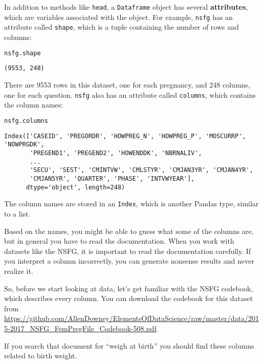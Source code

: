 In addition to methods like \passthrough{\lstinline!head!}, a
\passthrough{\lstinline!Dataframe!} object has several
\textbf{attributes}, which are variables associated with the object. For
example, \passthrough{\lstinline!nsfg!} has an attribute called
\passthrough{\lstinline!shape!}, which is a tuple containing the number
of rows and columns:

\begin{lstlisting}[language=Python,style=source]
nsfg.shape
\end{lstlisting}

\begin{lstlisting}[style=output]
(9553, 248)
\end{lstlisting}

There are 9553 rows in this dataset, one for each pregnancy, and 248
columns, one for each question. \passthrough{\lstinline!nsfg!} also has
an attribute called \passthrough{\lstinline!columns!}, which contains
the column names:

\begin{lstlisting}[language=Python,style=source]
nsfg.columns
\end{lstlisting}

\begin{lstlisting}[style=output]
Index(['CASEID', 'PREGORDR', 'HOWPREG_N', 'HOWPREG_P', 'MOSCURRP', 'NOWPRGDK',
       'PREGEND1', 'PREGEND2', 'HOWENDDK', 'NBRNALIV',
       ...
       'SECU', 'SEST', 'CMINTVW', 'CMLSTYR', 'CMJAN3YR', 'CMJAN4YR',
       'CMJAN5YR', 'QUARTER', 'PHASE', 'INTVWYEAR'],
      dtype='object', length=248)
\end{lstlisting}

The column names are stored in an \passthrough{\lstinline!Index!}, which
is another Pandas type, similar to a list.

Based on the names, you might be able to guess what some of the columns
are, but in general you have to read the documentation. When you work
with datasets like the NSFG, it is important to read the documentation
carefully. If you interpret a column incorrectly, you can generate
nonsense results and never realize it.

So, before we start looking at data, let's get familiar with the NSFG
codebook, which describes every column. You can download the codebook
for this dataset from
\url{https://github.com/AllenDowney/ElementsOfDataScience/raw/master/data/2015-2017_NSFG_FemPregFile_Codebook-508.pdf}.

If you search that document for ``weigh at birth'' you should find these
columns related to birth weight.

